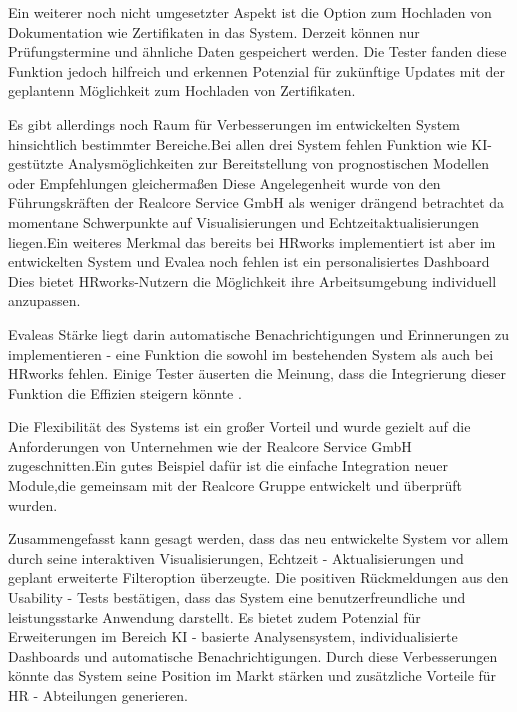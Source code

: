 Ein weiterer noch nicht umgesetzter Aspekt ist die Option zum Hochladen von Dokumentation wie Zertifikaten in das System. Derzeit können nur Prüfungstermine und ähnliche Daten gespeichert werden. Die Tester fanden diese Funktion jedoch hilfreich und erkennen Potenzial für zukünftige Updates mit der geplantenn Möglichkeit zum Hochladen von Zertifikaten. 

Es gibt allerdings noch Raum für Verbesserungen im entwickelten System hinsichtlich bestimmter Bereiche.Bei allen drei System fehlen Funktion wie KI-gestützte Analysmöglichkeiten zur Bereitstellung von prognostischen Modellen oder Empfehlungen gleichermaßen Diese Angelegenheit wurde von den Führungskräften der Realcore Service GmbH als weniger drängend betrachtet da momentane Schwerpunkte auf Visualisierungen und Echtzeitaktualisierungen liegen.Ein weiteres Merkmal das bereits bei HRworks implementiert ist aber im entwickelten System und Evalea noch fehlen ist ein personalisiertes Dashboard Dies bietet HRworks-Nutzern die Möglichkeit ihre Arbeitsumgebung individuell anzupassen. 

Evaleas Stärke liegt darin automatische Benachrichtigungen und Erinnerungen zu implementieren - eine Funktion die sowohl im bestehenden System als auch bei HRworks fehlen. Einige Tester äuserten die Meinung, dass die Integrierung dieser Funktion die Effizien steigern könnte .

Die Flexibilität des Systems ist ein großer Vorteil und wurde gezielt auf die Anforderungen von Unternehmen wie der Realcore Service GmbH zugeschnitten.Ein gutes Beispiel dafür ist die einfache Integration neuer Module,die gemeinsam mit der Realcore Gruppe entwickelt und überprüft wurden. 

Zusammengefasst kann gesagt werden, dass das neu entwickelte System vor allem durch seine interaktiven Visualisierungen, Echtzeit - Aktualisierungen und geplant erweiterte Filteroption überzeugte. Die positiven Rückmeldungen aus den Usability - Tests bestätigen, dass das System eine benutzerfreundliche und leistungsstarke Anwendung darstellt. Es bietet zudem Potenzial für Erweiterungen im Bereich KI - basierte Analysensystem, individualisierte Dashboards und automatische Benachrichtigungen. Durch diese Verbesserungen könnte das System seine Position im Markt stärken und zusätzliche Vorteile für HR - Abteilungen generieren. 